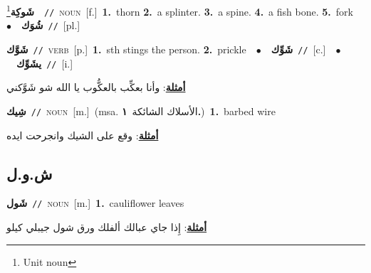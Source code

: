 \documentclass[10pt,a4paper,twoside]{article} %
\begin{document}
\begin{multicols}{2}
{\setlength\topsep{0pt}\textbf{\foreignlanguage{arabic}{شَوكِة}}\footnote{Unit noun}\ \ {\color{gray}\texttt{//}\color{black}}\ \textsc{noun}\ [f.]\ \textbf{1.}~thorn  \textbf{2.}~a splinter.  \textbf{3.}~a spine.  \textbf{4.}~a fish bone.  \textbf{5.}~fork\ \ $\bullet$\ \ \setlength\topsep{0pt}\textbf{\foreignlanguage{arabic}{شُوَك}}\ {\color{gray}\texttt{//}\color{black}}\ [pl.]\ } \vspace{2mm}

{\setlength\topsep{0pt}\textbf{\foreignlanguage{arabic}{شَوَّك}}\ {\color{gray}\texttt{//}\color{black}}\ \textsc{verb}\ [p.]\ \textbf{1.}~sth stings the person.  \textbf{2.}~prickle\ \ $\bullet$\ \ \setlength\topsep{0pt}\textbf{\foreignlanguage{arabic}{شَوِّك}}\ {\color{gray}\texttt{//}\color{black}}\ [c.]\ \ $\bullet$\ \ \setlength\topsep{0pt}\textbf{\foreignlanguage{arabic}{يشَوِّك}}\ {\color{gray}\texttt{//}\color{black}}\ [i.]\  \begin{flushright}\color{gray}\foreignlanguage{arabic}{\textbf{\underline{\foreignlanguage{arabic}{أمثلة}}}: وأنا بعكِّب بالعكُّوب يا الله شو شَوَّكني}\end{flushright}\color{black}} \vspace{2mm}

{\setlength\topsep{0pt}\textbf{\foreignlanguage{arabic}{شِيك}}\ {\color{gray}\texttt{//}\color{black}}\ \textsc{noun}\ [m.]\ \color{gray}(msa. \foreignlanguage{arabic}{الأسلاك الشائكة}~\foreignlanguage{arabic}{\textbf{١.}})\color{black}\ \textbf{1.}~barbed wire\  \begin{flushright}\color{gray}\foreignlanguage{arabic}{\textbf{\underline{\foreignlanguage{arabic}{أمثلة}}}: وقع على الشيك وانجرحت ايده}\end{flushright}\color{black}} \vspace{2mm}

\vspace{-3mm}
\subsection*{\color{blue}\foreignlanguage{arabic}{ش.و.ل}\color{blue}{}} 

{\setlength\topsep{0pt}\textbf{\foreignlanguage{arabic}{شَول}}\ {\color{gray}\texttt{//}\color{black}}\ \textsc{noun}\ [m.]\ \textbf{1.}~cauliflower leaves\  \begin{flushright}\color{gray}\foreignlanguage{arabic}{\textbf{\underline{\foreignlanguage{arabic}{أمثلة}}}: إِذا جاي عبالك ألفلك ورق شول جيبلي كيلو}\end{flushright}\color{black}} \vspace{2mm}


\end{multicols}
\end{document}
